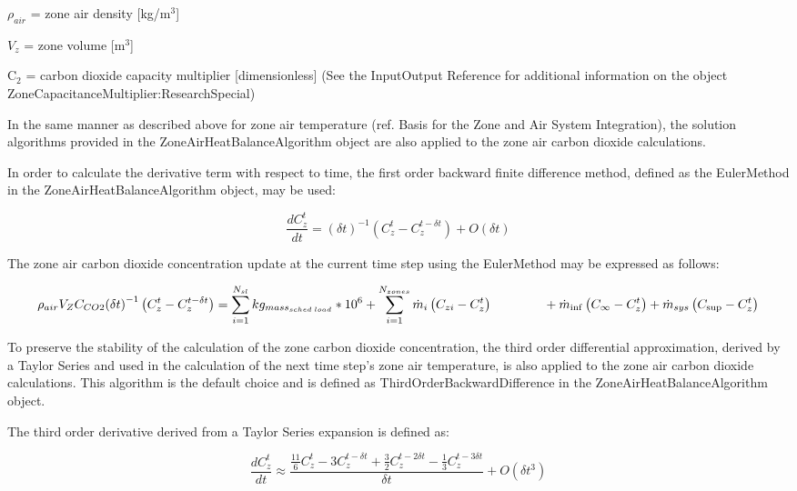 \({\rho_{air}}\) = zone air density {[}kg/m\(^{3}\){]}

\({V_z}\) = zone volume {[}m\(^{3}\){]}

C\(_{2}\) = carbon dioxide capacity multiplier {[}dimensionless{]} (See the InputOutput Reference for additional information on the object ZoneCapacitanceMultiplier:ResearchSpecial)

In the same manner as described above for zone air temperature (ref. Basis for the Zone and Air System Integration), the solution algorithms provided in the ZoneAirHeatBalanceAlgorithm object are also applied to the zone air carbon dioxide calculations.

In order to calculate the derivative term with respect to time, the first order backward finite difference method, defined as the EulerMethod in the ZoneAirHeatBalanceAlgorithm object, may be used:

\begin{equation}
\frac{{dC_z^t}}{{dt}} = {\left( {\delta t} \right)^{ - 1}}(C_z^t - C_z^{t - \delta t}) + O(\delta t)
\end{equation}

The zone air carbon dioxide concentration update at the current time step using the EulerMethod may be expressed as follows:

\begin{equation}
{\rho_{air}}{V_Z}{C_{CO2}}{\left( {\delta t} \right)^{ - 1}}\left( {C_z^t - C_z^{t - \delta t}} \right) = \sum\limits_{i = 1}^{{N_{sl}}} {k{g_{mas{s_{sched\;load}}}}} *{10^6} + \sum\limits_{i = 1}^{{N_{zones}}} {{{\dot m}_i}} \left( {{C_{zi}} - C_z^t} \right) \\
\quad \quad \quad \quad + {\dot m_{\inf }}\left( {{C_\infty } - C_z^t} \right) + {\dot m_{sys}}\left( {{C_{\sup }} - C_z^t} \right)
\end{equation}

To preserve the stability of the calculation of the zone carbon dioxide concentration, the third order differential approximation, derived by a Taylor Series and used in the calculation of the next time step's zone air temperature, is also applied to the zone air carbon dioxide calculations. This algorithm is the default choice and is defined as ThirdOrderBackwardDifference in the ZoneAirHeatBalanceAlgorithm object.

The third order derivative derived from a Taylor Series expansion is defined as:

\begin{equation}
\frac{{dC_z^t}}{{dt}} \approx \frac{{\frac{{11}}{6}C_z^t - 3C_z^{t - \delta t} + \frac{3}{2}C_z^{t - 2\delta t} - \frac{1}{3}C_z^{t - 3\delta t}}}{{\delta t}} + O(\delta {t^3})
\end{equation}

